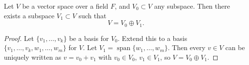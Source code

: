 \begin{proposition}
  Let $V$ be a vector space over a field $F$, and $V_0 \subset V$ any subspace. Then there exists a subspace $V_1 \subset V$ such that
  \[
    V = V_0 \oplus V_1.
  \]
\end{proposition}

\begin{proof}
  Let $\{v_1, \ldots, v_k\}$ be a basis for $V_0$. Extend this to a basis $\{v_1, \ldots, v_k, w_1, \ldots, w_m\}$ for $V$. Let $V_1 = \operatorname{span}\{w_1, \ldots, w_m\}$. Then every $v \in V$ can be uniquely written as $v = v_0 + v_1$ with $v_0 \in V_0$, $v_1 \in V_1$, so $V = V_0 \oplus V_1$.
\end{proof}